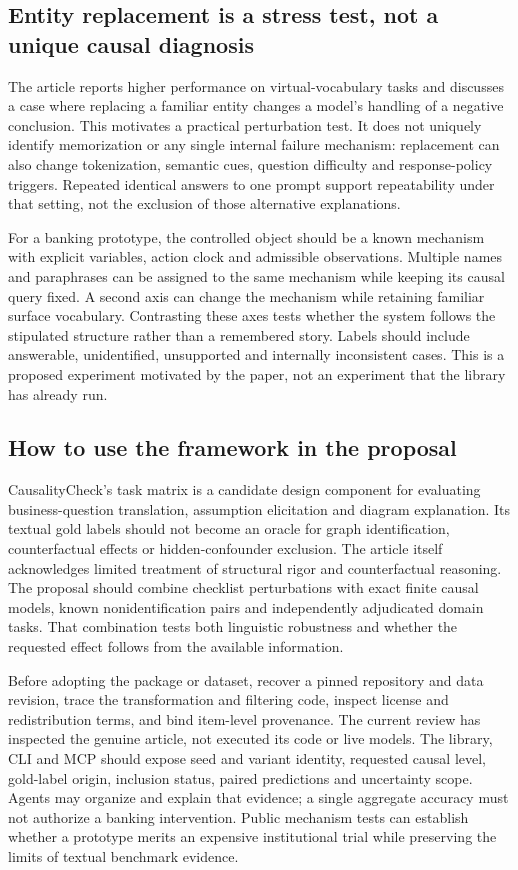\subsection{Entity replacement is a stress test, not a unique causal diagnosis}
\label{exec21:check-rename}
The article reports higher performance on virtual-vocabulary tasks and discusses a case where replacing a familiar entity changes a model's handling of a negative conclusion. This motivates a practical perturbation test. It does not uniquely identify memorization or any single internal failure mechanism: replacement can also change tokenization, semantic cues, question difficulty and response-policy triggers. Repeated identical answers to one prompt support repeatability under that setting, not the exclusion of those alternative explanations.~\citep{exec21_causalitycheck}

For a banking prototype, the controlled object should be a known mechanism with explicit variables, action clock and admissible observations. Multiple names and paraphrases can be assigned to the same mechanism while keeping its causal query fixed. A second axis can change the mechanism while retaining familiar surface vocabulary. Contrasting these axes tests whether the system follows the stipulated structure rather than a remembered story. Labels should include answerable, unidentified, unsupported and internally inconsistent cases. This is a proposed experiment motivated by the paper, not an experiment that the library has already run.

\subsection{How to use the framework in the proposal}
\label{exec21:check-integration}
CausalityCheck's task matrix is a candidate design component for evaluating business-question translation, assumption elicitation and diagram explanation. Its textual gold labels should not become an oracle for graph identification, counterfactual effects or hidden-confounder exclusion. The article itself acknowledges limited treatment of structural rigor and counterfactual reasoning. The proposal should combine checklist perturbations with exact finite causal models, known nonidentification pairs and independently adjudicated domain tasks. That combination tests both linguistic robustness and whether the requested effect follows from the available information.~\citep{exec21_causalitycheck}

Before adopting the package or dataset, recover a pinned repository and data revision, trace the transformation and filtering code, inspect license and redistribution terms, and bind item-level provenance. The current review has inspected the genuine article, not executed its code or live models. The library, CLI and MCP should expose seed and variant identity, requested causal level, gold-label origin, inclusion status, paired predictions and uncertainty scope. Agents may organize and explain that evidence; a single aggregate accuracy must not authorize a banking intervention. Public mechanism tests can establish whether a prototype merits an expensive institutional trial while preserving the limits of textual benchmark evidence.


